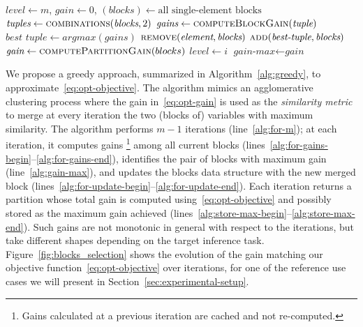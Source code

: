 \documentclass[journal]{IEEEtran}
\theoremstyle{plain} %
\begin{document}

\begin{algorithm}[tb]
\caption{SPP greedy algorithm.}
\label{alg:greedy}
\begin{algorithmic}[1]
\small
\State $\textit{level} \gets m$, $\textit{gain} \gets 0$, $(\textit{blocks}) \gets \text{all single-element blocks}$ %
 \label{alg:for-m}
    \State $\textit{tuples} \gets \Call {combinations}{\textit{blocks}, 2}$ 
     \label{alg:for-gains-begin}
        \State $\textit{gains} \gets \Call {computeBlockGain}{\textit{tuple}}$ %
    \EndFor \label{alg:for-gains-end}
    \State $\textit{best tuple} \gets argmax(\textit{gains})$ \label{alg:gain-max}
     \label{alg:for-update-begin} %
                \State $\Call{remove}{\textit{element}, \textit{blocks}}$
            \EndIf
        \EndFor
    \EndFor
    \State $\Call{add}{\textit{best-tuple}, \textit{blocks}}$ \label{alg:for-update-end}
    \State $\textit{gain} \gets \Call{computePartitionGain}{blocks}$ \label{alg:store-max-begin}
        \State $\textit{level} \gets i$
        \State $\textit{gain-max} \gets \textit{gain}$
    \EndIf \label{alg:store-max-end}
\EndFor
\end{algorithmic}
\end{algorithm}

We propose a greedy approach, summarized in Algorithm~\ref{alg:greedy}, to approximate~\eqref{eq:opt-objective}.
The algorithm mimics an agglomerative clustering process where the gain in~\eqref{eq:opt-gain} is used as the \textit{similarity metric} to merge at every iteration the two (blocks of) variables with maximum similarity.
The algorithm performs $m-1$ iterations (line~\ref{alg:for-m}); at each iteration, it computes gains%
\footnote{Gains calculated at a previous iteration are cached and not re-computed.}
among all current blocks (lines~\ref{alg:for-gains-begin}--\ref{alg:for-gains-end}), identifies the pair of blocks with maximum gain (line~\ref{alg:gain-max}), and updates the blocks data structure with the new merged block (lines~\ref{alg:for-update-begin}--\ref{alg:for-update-end}).
%
Each iteration returns a partition whose total gain is computed using~\eqref{eq:opt-objective} and possibly stored as the maximum gain achieved (lines~\ref{alg:store-max-begin}--\ref{alg:store-max-end}).
Such gains are not monotonic in general with respect to the iterations, but take different shapes depending on the target inference task. Figure~\ref{fig:blocks_selection} shows the evolution of the gain matching our objective function~\eqref{eq:opt-objective} over iterations, for one of the reference use cases we will present in Section~\ref{sec:experimental-setup}.
\end{document}
